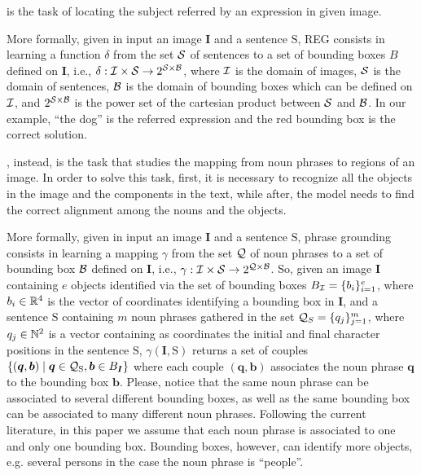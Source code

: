 is the task of locating
the subject referred by an expression in given image. 

More formally, given in input an image $\bm{I}$ and a sentence
$\mathrm{S}$, REG consists in learning a function $\delta$ from the
set $\mathcal{S}$ of sentences to a set of bounding boxes $B$ defined on
$\bm{I}$, i.e., $\delta: \mathcal{I} \times \mathcal{S} \rightarrow 2^{\mathcal{S}
\times \mathcal{B}}$, where $\mathcal{I}$ is the domain of images, $\mathcal{S}$ is the
domain of sentences, $\mathcal{B}$ is the domain of bounding boxes which can
be defined on $\mathcal{I}$, and $2^{\mathcal{S} \times \mathcal{B}}$ is the power set
of the cartesian product between $\mathcal{S}$ and $\mathcal{B}$. In our example,
``the dog'' is the referred expression and the red bounding box is the
correct solution.

, instead, is the task that studies the
mapping from noun phrases to regions of an image. In order to solve
this task, first, it is necessary to recognize all the objects in the
image and the components in the text, while after, the model needs to
find the correct alignment among the nouns and the objects.

More formally, given in input an image $\bm{I}$ and a sentence
$\mathrm{S}$, phrase grounding consists in learning a mapping $\gamma$
from the set $\mathcal{Q}$ of noun phrases to a set of bounding box $\mathcal{B}$
defined on $\bm{I}$, i.e., $\gamma : \mathcal{I} \times \mathcal{S} \rightarrow
2^{\mathcal{Q} \times \mathcal{B}}$. So, given an image $\bm{I}$ containing $e$
objects identified via the set of bounding boxes $B_{\mathcal{I}} = \{ b_i
\}^e_{i=1}$, where $b_i \in \mathbb{R}^4$ is the vector of coordinates
identifying a bounding box in $\bm{I}$, and a sentence $\mathrm{S}$
containing $m$ noun phrases gathered in the set $\mathcal{Q}_S = \{ q_j
\}^m_{j=1}$, where $q_j \in \mathbb{N}^2$ is a vector containing as
coordinates the initial and final character positions in the sentence
$\mathrm{S}$, $\gamma(\bm{I}, \mathrm{S})$ returns a set of couples
$\{ (\bm{q}, \bm{b}) \mid \bm{q} \in \mathcal{Q}_{\mathrm{S}}, \bm{b} \in
B_{\bm{I}} \}$ where each couple $(\bm{q}, \bm{b})$ associates the
noun phrase $\bm{q}$ to the bounding box $\bm{b}$. Please, notice that
the same noun phrase can be associated to several different bounding
boxes, as well as the same bounding box can be associated to many
different noun phrases. Following the current literature, in this
paper we assume that each noun phrase is associated to one and only
one bounding box. Bounding boxes, however, can identify more objects,
e.g. several persons in the case the noun phrase is ``people''.

